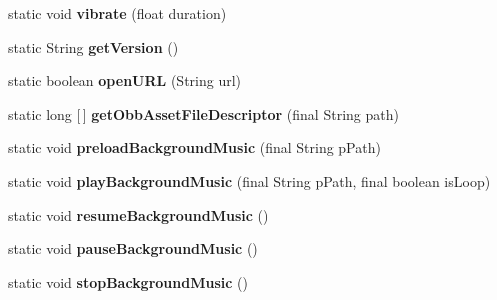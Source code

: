 \begin{DoxyCompactItemize}
static void {\bfseries vibrate} (float duration)
\item 
\mbox{\label{classorg_1_1cocos2dx_1_1lib_1_1Cocos2dxHelper_af1239427d48b427e3b9c39e1a5aee094}} 
static String {\bfseries get\+Version} ()
\item 
\mbox{\label{classorg_1_1cocos2dx_1_1lib_1_1Cocos2dxHelper_a5954eb2605e81c3117668e30bd242100}} 
static boolean {\bfseries open\+U\+RL} (String url)
\item 
\mbox{\label{classorg_1_1cocos2dx_1_1lib_1_1Cocos2dxHelper_adb353e545d2de3b02be23c69343a51a9}} 
static long \mbox{[}$\,$\mbox{]} {\bfseries get\+Obb\+Asset\+File\+Descriptor} (final String path)
\item 
\mbox{\label{classorg_1_1cocos2dx_1_1lib_1_1Cocos2dxHelper_acad26aaaec46f97491179ba172ca22a3}} 
static void {\bfseries preload\+Background\+Music} (final String p\+Path)
\item 
\mbox{\label{classorg_1_1cocos2dx_1_1lib_1_1Cocos2dxHelper_a48649e5845399e53b6b9e626a047bca1}} 
static void {\bfseries play\+Background\+Music} (final String p\+Path, final boolean is\+Loop)
\item 
\mbox{\label{classorg_1_1cocos2dx_1_1lib_1_1Cocos2dxHelper_a88e3c0a5a161e74c4dc46fdbae584517}} 
static void {\bfseries resume\+Background\+Music} ()
\item 
\mbox{\label{classorg_1_1cocos2dx_1_1lib_1_1Cocos2dxHelper_ab16080cfbf32edd70d9958b605dd2b00}} 
static void {\bfseries pause\+Background\+Music} ()
\item 
\mbox{\label{classorg_1_1cocos2dx_1_1lib_1_1Cocos2dxHelper_a06f298c54c67bca87dc741794cd5bf2c}} 
static void {\bfseries stop\+Background\+Music} ()
\item 
\mbox{\label{classorg_1_1cocos2dx_1_1lib_1_1Cocos2dxHelper_aa29d148216e262a9633e9cf52dd2c673}} 

\end{DoxyCompactItemize}
